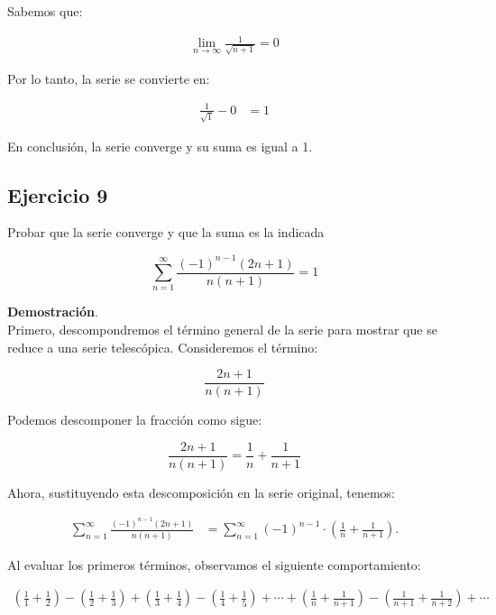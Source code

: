 \documentclass{article}
\begin{document}
    Sabemos que:

    \begin{align*}
    \lim_{n \to \infty} \frac{1}{\sqrt{n+1}} = 0
    \end{align*}

    Por lo tanto, la serie se convierte en:

    \begin{align*}
    \frac{1}{\sqrt{1}} - 0 &= 1
    \end{align*}

    En conclusión, la serie converge y su suma es igual a 1.



    \subsection*{Ejercicio 9}

    Probar que la serie converge y que la suma es la indicada

    $$
    \sum_{n=1}^{\infty} \frac{(-1)^{n-1}(2 n+1)}{n(n+1)}=1
    $$

    \textbf{Demostración}.\\

    Primero, descompondremos el término general de la serie para mostrar que se reduce a una serie telescópica. Consideremos el término:

    $$
    \frac{2 n+1}{n(n+1)}
    $$

    Podemos descomponer la fracción como sigue:

    $$
    \frac{2 n+1}{n(n+1)}=\frac{1}{n}+\frac{1}{n+1}
    $$

    Ahora, sustituyendo esta descomposición en la serie original, tenemos:

    $$
    \begin{align*}
    \sum_{n=1}^{\infty} \frac{(-1)^{n-1}(2 n+1)}{n(n+1)} &= \sum_{n=1}^{\infty}(-1)^{n-1} \cdot\left(\frac{1}{n}+\frac{1}{n+1}\right).
    \end{align*}
    $$

    Al evaluar los primeros términos, observamos el siguiente comportamiento:

    $$
    \begin{gathered}
    \left(\frac{1}{1}+\frac{1}{2}\right) - \left(\frac{1}{2}+\frac{1}{3}\right) + \left(\frac{1}{3}+\frac{1}{4}\right) - \left(\frac{1}{4}+\frac{1}{5}\right) + \cdots + \left(\frac{1}{n}+\frac{1}{n+1}\right) - \left(\frac{1}{n+1}+\frac{1}{n+2}\right) + \cdots
    \end{gathered}
    $$
\end{document}

